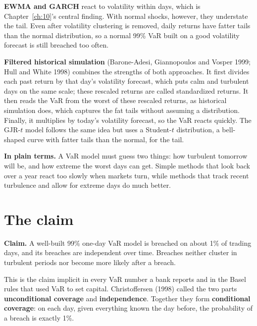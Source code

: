 \textbf{EWMA and GARCH} react to volatility within days, which is Chapter~\ref{ch:10}'s central finding. With normal shocks, however, they understate the tail. Even after volatility clustering is removed, daily returns have fatter tails than the normal distribution, so a normal 99\% VaR built on a good volatility forecast is still breached too often.

\textbf{Filtered historical simulation} (Barone-Adesi, Giannopoulos and Vosper 1999; Hull and White 1998) combines the strengths of both approaches. It first divides each past return by that day's volatility forecast, which puts calm and turbulent days on the same scale; these rescaled returns are called standardized returns. It then reads the VaR from the worst of these rescaled returns, as historical simulation does, which captures the fat tails without assuming a distribution. Finally, it multiplies by today's volatility forecast, so the VaR reacts quickly. The GJR-$t$ model follows the same idea but uses a Student-$t$ distribution, a bell-shaped curve with fatter tails than the normal, for the tail.

\noindent\textbf{In plain terms.} A VaR model must guess two things: how turbulent tomorrow will be, and how extreme the worst days can get. Simple methods that look back over a year react too slowly when markets turn, while methods that track recent turbulence and allow for extreme days do much better.



\section{The claim}
\label{sec:11-claim}

\begin{callout}
\textbf{Claim.} A well-built 99\% one-day VaR model is breached on about 1\% of trading days, and its breaches are independent over time. Breaches neither cluster in turbulent periods nor become more likely after a breach.
\end{callout}

This is the claim implicit in every VaR number a bank reports and in the Basel rules that used VaR to set capital. Christoffersen (1998) called the two parts \textbf{unconditional coverage} and \textbf{independence}. Together they form \textbf{conditional coverage}: on each day, given everything known the day before, the probability of a breach is exactly 1\%.

